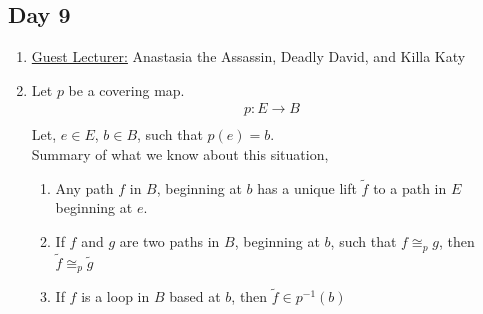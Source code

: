 \subsection{Day 9}
    \begin{enumerate}
        \item \underline{Guest Lecturer:} Anastasia the Assassin, Deadly David, and Killa Katy
        \item Let $p$ be a covering map.
            \begin{align*}
                p: E\rightarrow B\\
            \end{align*}
            Let, $e\in E$, $b\in B$, such that $p(e)=b$.\\
            Summary of what we know about this situation,
            \begin{enumerate}
                \item Any path $f$ in $B$, beginning at $b$ has a unique lift $\tilde{f}$ to a path in $E$ beginning at $e$.
                \item If $f$ and $g$ are two paths in $B$, beginning at $b$, such that $f\cong_{p}g$, then
                    $\tilde{f}\cong_{p}\tilde{g}$
                \item If $f$ is a loop in $B$ based at $b$, then $\tilde{f}\in p^{-1}(b)$
            \end{enumerate}
    \end{enumerate}

